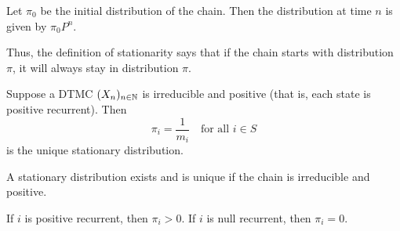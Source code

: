 \begin{exercise*}
    Let $\pi_0$ be the initial distribution of the chain.
    Then the distribution at time $n$ is given by $\pi_0 P^n$.
\end{exercise*}
Thus, the definition of stationarity says that if the chain starts with
distribution $\pi$, it will always stay in distribution $\pi$.

\begin{theorem*} \label{thm:dtmc:stationary}
    Suppose a DTMC $(X_n)_{n \in \mathbb{N}}$ is irreducible and positive
    (that is, each state is positive recurrent).
    Then \[
        \pi_i = \frac1{m_i} \quad \text{for all $i \in S$}
    \] is the unique stationary distribution.
\end{theorem*}
\begin{remarks}
    \item A stationary distribution exists and is unique if the chain is
        irreducible and positive.
    \item If $i$ is positive recurrent, then $\pi_i > 0$.
        If $i$ is null recurrent, then $\pi_i = 0$.
\end{remarks}
